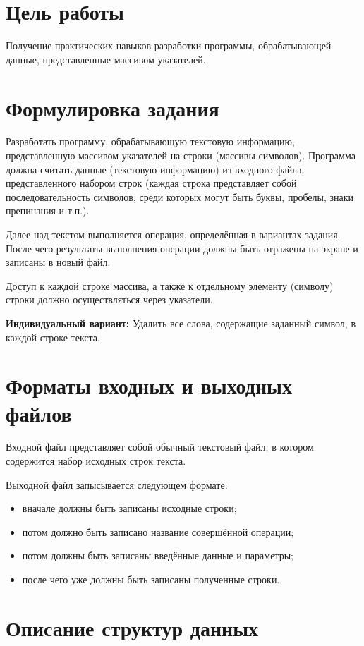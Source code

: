 \documentclass[12pt,a4paper]{article}  %
\begin{document}
	\section*{Цель работы}
	
	Получение
	практических
	навыков
	разработки
	программы,
	обрабатывающей данные, представленные массивом указателей.
	
	\section*{Формулировка задания}
	
	Разработать программу, обрабатывающую текстовую информацию,
	представленную массивом указателей на строки (массивы символов).
	Программа должна считать данные (текстовую информацию) из
	входного файла, представленного набором строк (каждая строка
	представляет собой последовательность символов, среди которых могут быть
	буквы, пробелы, знаки препинания и т.п.). 
	
	Далее над текстом выполняется
	операция, определённая в вариантах задания. После чего результаты
	выполнения операции должны быть отражены на экране и записаны в новый
	файл.
	
	Доступ к каждой строке массива, а также к отдельному элементу
	(символу) строки должно осуществляться через указатели.
	
	\textbf{Индивидуальный вариант:} Удалить все слова, содержащие заданный символ, в каждой строке текста.
	
	\section*{Форматы входных и выходных файлов}
	
	Входной файл представляет собой обычный текстовый файл, в котором содержится набор исходных строк текста.
	
	Выходной файл запысывается следующем формате:
	\begin{itemize}
		\item вначале должны быть записаны исходные строки;
		\item потом должно быть записано название совершённой операции;
		\item потом должны быть записаны введённые данные и параметры;
		\item после чего уже должны быть записаны полученные строки.
	\end{itemize}
	
	\newpage
	\section*{Описание структур данных}
	
\end{document}
